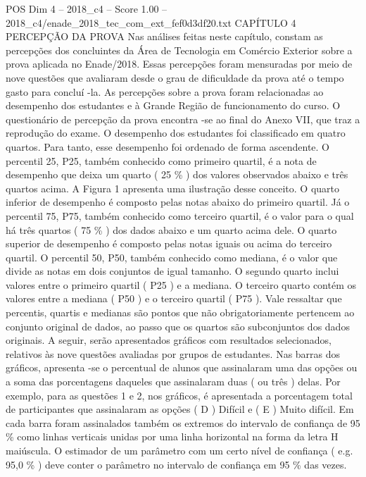 \begin{textsample}{POS Dim 4 – 2018\_c4 – Score 1.00 – 2018\_c4/enade\_2018\_tec\_com\_ext\_fef0d3df20.txt}  \label{ex:f4_pos_190}
CAPÍTULO 4 PERCEPÇÃO DA PROVA Nas análises feitas neste capítulo, constam as percepções dos concluintes da Área de Tecnologia em Comércio Exterior sobre a prova aplicada no Enade/2018.
Essas percepções foram mensuradas por meio de nove questões que avaliaram desde o grau de dificuldade da prova até o tempo gasto para concluí -la.
As percepções sobre a prova foram relacionadas ao desempenho dos estudantes e à Grande Região de funcionamento do curso.
O questionário de percepção da prova encontra -se ao final do Anexo VII, que traz a reprodução do exame.
O desempenho dos estudantes foi classificado em quatro quartos.
Para tanto, esse desempenho foi ordenado de forma ascendente.
O percentil 25, P25, também conhecido como primeiro quartil, é a nota de desempenho que deixa um quarto ( 25 \% ) dos valores observados abaixo e três quartos acima.
A Figura 1 apresenta uma ilustração desse conceito.
O quarto inferior de desempenho é composto pelas notas abaixo do primeiro quartil.
Já o percentil 75, P75, também conhecido como terceiro quartil, é o valor para o qual há três quartos ( 75 \% ) dos dados abaixo e um quarto acima dele.
O quarto superior de desempenho é composto pelas notas iguais ou acima do terceiro quartil.
O percentil 50, P50, também conhecido como mediana, é o valor que divide as notas em dois conjuntos de igual tamanho.
O segundo quarto inclui valores entre o primeiro quartil ( P25 ) e a mediana.
O terceiro quarto contém os valores entre a mediana ( P50 ) e o terceiro quartil ( P75 ).
Vale ressaltar que percentis, quartis e medianas são pontos que não obrigatoriamente pertencem ao conjunto original de dados, ao passo que os quartos são subconjuntos dos dados originais.
A seguir, serão apresentados gráficos com resultados selecionados, relativos às nove questões avaliadas por grupos de estudantes.
Nas barras dos gráficos, apresenta -se o percentual de alunos que assinalaram uma das opções ou a soma das porcentagens daqueles que assinalaram duas ( ou três ) delas.
Por exemplo, para as questões 1 e 2, nos gráficos, é apresentada a porcentagem total de participantes que assinalaram as opções ( D ) Difícil e ( E ) Muito difícil.
Em cada barra foram assinalados também os extremos do intervalo de confiança de 95 \% como linhas verticais unidas por uma linha horizontal na forma da letra H maiúscula.
O estimador de um parâmetro com um certo nível de confiança ( e.g. 95,0 \% ) deve conter o parâmetro no intervalo de confiança em 95 \% das vezes.

\end{textsample}
